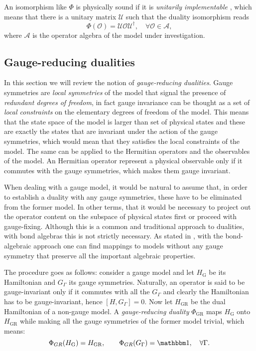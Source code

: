 An isomorphism like $\Phi$ is physically sound if it is \emph{unitarily implementable} \cite{cobanera2011bond}, which means that there is a unitary matrix $\mathcal{U}$ such that the duality isomorphism reads
\begin{equation}
    \Phi(\mathcal{O}) =
    \mathcal{U} \mathcal{O} \mathcal{U}^{\dagger}, \quad
    \forall \mathcal{O} \in \mathcal{A},
\end{equation}
where $\mathcal{A}$ is the operator algebra of the model under investigation.



\subsection{Gauge-reducing dualities}%
\label{sub:gauge_reducing_dualities}

In this section we will review the notion of \emph{gauge-reducing dualities}.
Gauge symmetries are \emph{local symmetries} of the model that signal the presence of \emph{redundant degrees of freedom}, in fact gauge invariance can be thought as a set of \emph{local constraints} on the elementary degrees of freedom of the model.
This means that the state space of the model is larger than set of physical states and these are exactly the states that are invariant under the action of the gauge symmetries, which would mean that they satisfies the local constraints of the model.
The same can be applied to the Hermitian operators and the observables of the model.
An Hermitian operator represent a physical observable only if it commutes with the gauge symmetries, which makes them gauge invariant.

When dealing with a gauge model, it would be natural to assume that, in order to establish a duality with any gauge symmetries, these have to be eliminated from the former model.
In other terms, that it would be necessary to project out the operator content on the subspace of physical states first or proceed with gauge-fixing.
Although this is a common and traditional approach to dualities, with bond algebras this is not strictly necessary.
As stated in \cite{cobanera2011bond}, with the bond-algebraic approach one can find mappings to models without any gauge symmetry that preserve all the important algebraic properties.

The procedure goes as follows: consider a gauge model and let $H_{\text{G}}$ be its Hamiltonian and $G_{\Gamma}$ its gauge symmetries.
Naturally, an operator is said to be gauge-invariant only if it commutes with all the $G_{\Gamma}$ and
clearly the Hamiltonian has to be gauge-invariant, hence $[H, G_{\Gamma}] = 0$.
Now let $H_{\text{GR}}$ be the dual Hamiltonian of a non-gauge model.
A \emph{gauge-reducing duality} $\Phi_{\text{GR}}$ maps $H_{\text{G}}$ onto $H_{\text{GR}}$ while making all the gauge symmetries of the former model trivial, which means:
\begin{equation}
    \Phi_{GR}(H_{\text{G}}) = H_{\text{GR}}, \qquad
    \Phi_{GR}(G_{\Gamma}) = \One, \quad \forall \Gamma.
\end{equation}

